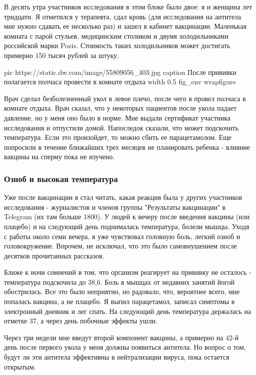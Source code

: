В десять утра участников исследования в этом блоке было двое: я и женщина лет
тридцати. Я отметился у терапевта, сдал кровь (для исследования на антитела мне
нужно сдавать ее несколько раз) и зашел в кабинет вакцинации. Маленькая комната
с парой стульев, медицинским столиком и двумя холодильниками российской марки
Pozis. Стоимость таких холодильников может достигать примерно 150 тысяч рублей
за штуку.

\ifcmt
  pic https://static.dw.com/image/55809056_403.jpg
  caption После прививки полагается полчаса провести в комнате отдыха 
  width 0.5
  fig_env wrapfigure
\fi

Врач сделал безболезненный укол в левое плечо, после чего я провел полчаса в
комнате отдыха. Врач сказал, что у некоторых пациентов после укола падает
давление, но у меня оно было в норме. Мне выдали сертификат участника
исследования и отпустили домой. Напоследок сказали, что может подскочить
температура. Если это произойдет, то можно сбить ее парацетамолом. Еще
попросили в течение ближайших трех месяцев не планировать ребенка - влияние
вакцины на сперму пока не изучено.

\subsubsection{Озноб и высокая температура}

Уже после вакцинации я стал читать, какая реакция была у других участников
исследования - журналистов и членов группы "Результаты вакцинации" в Telegram
(их там больше 1800). У людей к вечеру после введения вакцины (или плацебо) и
на следующий день поднималась температура, болели мышцы. Уходя с работы около
семи вечера, я уже чувствовал головную боль, легкий озноб и головокружение.
Впрочем, не исключал, что это было самовнушением после десятков прочитанных
рассказов.

Ближе к ночи сомнений в том, что организм реагирует на прививку не осталось -
температура подскочила до 38,6. Боль в мышцах от недавних занятий йогой
обострилась. Все это было неприятно, но радовало, что, вероятнее всего, мне
попалась вакцина, а не плацебо. Я выпил парацетамол, записал симптомы в
электронный дневник и лег спать. На следующий день температура держалась на
отметке 37, а через день побочные эффекты ушли.

Через три недели мне введут второй компонент вакцины, а примерно на 42-й день
после первого укола у меня должны появиться антитела. Но вопрос о том, будут ли
эти антитела эффективны в нейтрализации вируса, пока остается открытым.
